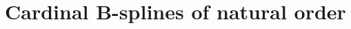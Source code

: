 \documentclass[12pt, class = article, crop = false, a4paper, twoside]{standalone}
\begin{document}
\section{Cardinal B-splines of natural order}
\label{sec:splines:cardinal}

\end{document}
